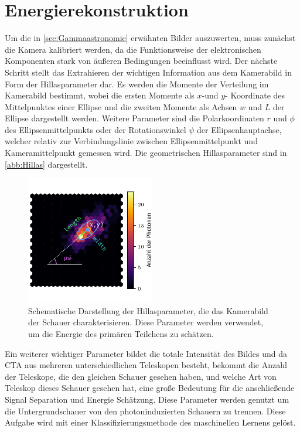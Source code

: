 \section{Energierekonstruktion}

Um die in \autoref{sec:Gammaastronomie} erwähnten Bilder auszuwerten, muss zunächst die Kamera kalibriert werden, da die Funktionsweise der elektronischen
Komponenten stark von äußeren Bedingungen beeinflusst wird.
Der nächste Schritt stellt das Extrahieren der wichtigen Information aus dem Kamerabild in Form der Hillasparameter dar.
Es werden die Momente der Verteilung im Kamerabild bestimmt, wobei die ersten Momente als $x$-und $y$- Koordinate des Mittelpunktes einer Ellipse und die zweiten Momente als Achsen $w$ und $L$ der Ellipse
dargestellt werden.
Weitere Parameter sind die Polarkoordinaten $r$ und $\phi$ des Ellipsenmittelpunkts oder der Rotationswinkel $\psi$
der Ellipsenhauptachse, welcher relativ zur Verbindungslinie zwischen Ellipsenmittelpunkt und Kameramittelpunkt gemessen wird.
Die geometrischen Hillasparameter sind in \autoref{abb:Hillas} dargestellt.
\begin{figure}
  \includegraphics[width=0.5\textwidth]{Plots/hillas_2.pdf}
  \centering
  \caption{Schematische Darstellung der Hillasparameter, die das Kamerabild der Schauer charakterisieren. Diese Parameter
            werden verwendet, um die Energie des primären Teilchens zu schätzen.~\cite{Hillas_Max}}
  \label{abb:Hillas}
\end{figure}
Ein weiterer wichtiger Parameter bildet die totale Intensität des Bildes und da CTA aus mehreren unterschiedlichen Teleskopen besteht, bekommt die Anzahl
der Teleskope, die den gleichen Schauer gesehen haben, und welche Art von Teleskop dieses Schauer gesehen hat, eine große Bedeutung für die anschließende
Signal Separation und Energie Schätzung.
Diese Parameter werden genutzt um die Untergrundschauer von den photoninduzierten Schauern zu trennen.
Diese Aufgabe wird mit einer Klassifizierungsmethode des maschinellen Lernens gelöst.

